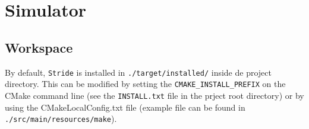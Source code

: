 \chapter{Simulator}
\label{chap:simulator}


\section{Workspace}

By default, \texttt{Stride} is installed in \texttt{./target/installed/} inside de project directory. This can be modified by setting the \texttt{CMAKE\_INSTALL\_PREFIX} on the CMake command line (see the \texttt{INSTALL.txt} file in the prject root directory) or by using the CMakeLocalConfig.txt file (example file can be found  in \texttt{./src/main/resources/make}).

